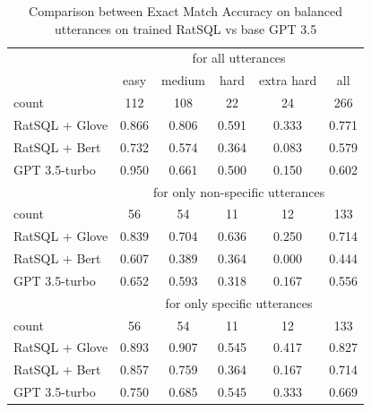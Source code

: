 \begin{table}[H]
    \begin{tabularx}{\textwidth}{Xccccc}
        \hline
                       & \multicolumn{5}{c}{for all utterances}                                                     \\
                       & easy                                                 & medium & hard  & extra hard & all   \\
        count          & 112                                                  & 108    & 22    & 24         & 266   \\ \hline
        RatSQL + Glove & 0.866                                                & 0.806  & 0.591 & 0.333      & 0.771 \\
        RatSQL + Bert  & 0.732                                                & 0.574  & 0.364 & 0.083      & 0.579 \\
        GPT 3.5-turbo  & 0.950                                                & 0.661  & 0.500 & 0.150      & 0.602 \\
        \hline
                       & \multicolumn{5}{c}{for only non-specific utterances}                                       \\
        count          & 56                                                   & 54     & 11    & 12         & 133   \\ \hline
        RatSQL + Glove & 0.839                                                & 0.704  & 0.636 & 0.250      & 0.714 \\
        RatSQL + Bert  & 0.607                                                & 0.389  & 0.364 & 0.000      & 0.444 \\
        GPT 3.5-turbo  & 0.652                                                & 0.593  & 0.318 & 0.167      & 0.556 \\
        \hline
                       & \multicolumn{5}{c}{for only specific utterances}                                           \\
        count          & 56                                                   & 54     & 11    & 12         & 133   \\ \hline
        RatSQL + Glove & 0.893                                                & 0.907  & 0.545 & 0.417      & 0.827 \\
        RatSQL + Bert  & 0.857                                                & 0.759  & 0.364 & 0.167      & 0.714 \\
        GPT 3.5-turbo  & 0.750                                                & 0.685  & 0.545 & 0.333      & 0.669 \\
    \end{tabularx}
    \caption{Comparison between Exact Match Accuracy on balanced utterances on trained RatSQL vs base GPT 3.5}
    \label{tab:balance}
\end{table}


